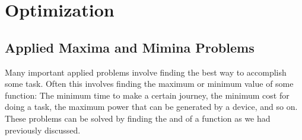 \chapter{Optimization}

\section{Applied Maxima and Mimina Problems}

Many important applied problems involve finding the best way to
accomplish some task. Often this involves finding the maximum or
minimum value of some function: The minimum time to make a certain
journey, the minimum cost for doing a task, the maximum power that can be generated by a device, and so on. These problems can be solved by finding the  and  of a function as we had previously discussed. \\

